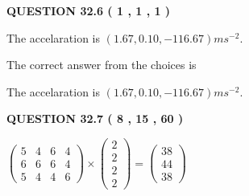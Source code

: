 \documentclass[12pt]{article}
\begin{document}
 
 
 
  
\vspace{0.2in}
  
{\textbf{\Large{QUESTION
32.6 
 (           1 ,           1 ,           1 )
}}}
  
  


 
 
\noindent{}
 
 
The accelaration is $  %
(
1.67,
0.10,
-116.67)
ms^{-2} $.
 
 
 
 
 
 
\noindent{}

The correct answer from the choices is


The accelaration is $  %
(
1.67,
0.10,
-116.67)
ms^{-2} $.
 
 
 
  
\vspace{0.2in}
  
{\textbf{\Large{QUESTION
32.7 
 (           8 ,          15 ,          60 )
}}}
  
  
 
 
\noindent{}

 
$\left( \begin{array}{ccccccccccccccc}
           5  & 
           4  & 
           6  & 
           4  \\ 
           6  & 
           6  & 
           6  & 
           4  \\ 
           5  & 
           4  & 
           4  & 
           6
\end{array}\right) \times
\left( \begin{array}{c}
           2  \\ 
           2  \\ 
           2  \\ 
           2
\end{array}\right)  =
\left( \begin{array}{c}
          38  \\ 
          44  \\ 
          38
\end{array}\right)  $
 
\end{document}
